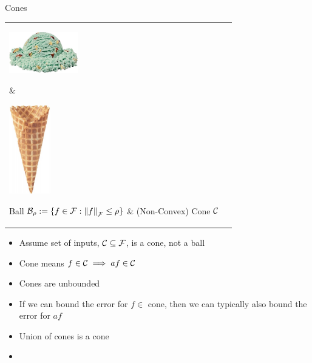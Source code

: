\documentclass[11pt,compress,xcolor={usenames,dvipsnames},aspectratio=169]{beamer}
\newcommand{\scoop}[1]{\parbox{#1}{\includegraphics[width=#1]{IceCreamScoop.eps}}\xspace}
\newcommand{\largescoop}{\scoop{3cm}}
\newcommand{\ICcone}[1]{\parbox{#1}{\includegraphics[width=#1,angle=270]{MediumWaffleCone.eps}}\xspace}
\newcommand{\largecone}{\ICcone{1.8cm}}
\begin{document}
\begin{frame}[label = ConeFrame]{Cones}
\vspace{-4ex}
\begin{tabular}{>{\centering}m{}@{\qquad}>{\centering}m{}}
     \largescoop \hspace{-3cm}\raisebox{-4ex}{\color{red}\fontsize{100}{120}\selectfont $\times$} & 
      \largecone \tabularnewline
      Ball $\cb_{\rho} := \{f \in \cf : \norm[\cf]{f} \le \rho \}$ &
      \hspace{2cm} (Non-Convex) Cone $\cc$
\end{tabular}

\begin{itemize}
    \item Assume set of inputs, $\cc \subseteq \cf$, is a \alert{cone}, not a ball
    
    \item \alert{Cone} means $f \in \cc \implies af \in \cc$
    
    \item \alert{Cones} are unbounded
    
    \item If we can bound the error for $f \in $ \alert{cone}, then we can typically also bound the error  for $af$
    
    \item Union of \alert{cones} is a \alert{cone}
    
    \item \hyperlink{BallsWontHelp}{}
\end{itemize}

    
\end{frame}
\end{document}
